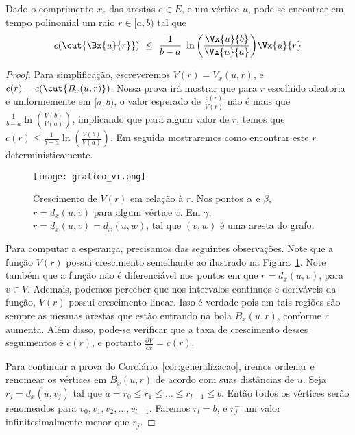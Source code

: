 \documentclass[12pt, a4paper]{article}
\begin{document}
\begin{corollary}
Dado o comprimento $x_e$ das arestas $e \in E$, e um vértice $u$, pode-se encontrar em tempo polinomial um raio $r \in [a, b)$ tal que
\[
    c(\cut{\Bx{u}{r}})\ \leq\ \frac{1}{b-a}\ \ln{\left( \frac{\Vx{u}{b}}{\Vx{u}{a}} \right)} \Vx{u}{r}
\]
\label{cor:generalizacao}
\end{corollary}
\begin{proof}

Para simplificação, escreveremos $V(r) = V_x(u, r)$, e $c(r) = c(\cut{B_x(u, r)})$.
Nossa prova irá mostrar que para $r$ escolhido aleatoria e uniformemente em $[a, b)$, o valor esperado de $\frac{c(r)}{V(r)}$ não é mais que $\frac{1}{b-a} \ln \left( \frac{V(b)}{V(a)}\right)$, implicando que para algum valor de $r$, temos que $c(r) \leq \frac{1}{b-a} \ln \left( \frac{V(b)}{V(a)}\right)$. Em seguida mostraremos como encontrar este $r$ deterministicamente.

\begin{figure}[!htb]
\centering
\texttt{[image: grafico\_vr.png]}
\caption{Crescimento de $V(r)$ em relação à $r$. Nos pontos $\alpha$ e $\beta$, $r = d_x(u, v)$ para algum vértice $v$. Em $\gamma$, $r = d_x(u, v) = d_x(u, w)$, tal que $(v, w)$ é uma aresta do grafo.}
\label{fig:grafico_vr}
\end{figure}

Para computar a esperança, precisamos das seguintes observações.
Note que a função $V(r)$ possui crescimento semelhante ao ilustrado na Figura~\ref{fig:grafico_vr}.
Note também que a função não é diferenciável nos pontos em que $r = d_x(u, v)$, para $v \in V$.
Ademais, podemos perceber que nos intervalos contínuos e deriváveis da função, $V(r)$ possui crescimento linear.
Isso é verdade pois em tais regiões são sempre as mesmas arestas que estão entrando na bola $B_x(u, r)$, conforme $r$ aumenta. Além disso, pode-se verificar que a taxa de crescimento desses seguimentos é $c(r)$, e portanto $\frac{\partial V}{\partial r} = c(r)$. 

Para continuar a prova do Corolário~\ref{cor:generalizacao}, iremos ordenar e renomear os vértices em $B_x(u, r)$ de acordo com suas distâncias de $u$. Seja $r_j = d_x(u, v_j)$ tal que $a = r_0 \leq r_1 \leq \dots \leq r_{l-1} \leq b$. Então todos os vértices serão renomeados para $v_0, v_1, v_2, \dots, v_{l-1}$. Faremos $r_l = b$, e $r_j^-$ um valor infinitesimalmente menor que $r_j$.


\end{proof}
\end{document}
